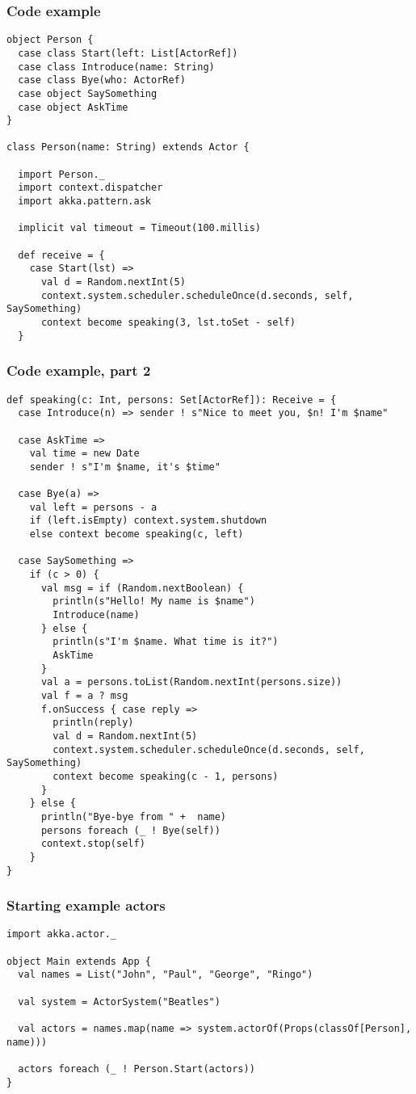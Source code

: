 \documentclass{beamer}
\begin{document}
\begin{frame}[fragile]
\frametitle{Code example}
\begin{lstlisting}[name=person]
object Person {
  case class Start(left: List[ActorRef])
  case class Introduce(name: String)
  case class Bye(who: ActorRef)
  case object SaySomething
  case object AskTime
}

class Person(name: String) extends Actor {

  import Person._
  import context.dispatcher
  import akka.pattern.ask

  implicit val timeout = Timeout(100.millis)

  def receive = {
    case Start(lst) =>
      val d = Random.nextInt(5)
      context.system.scheduler.scheduleOnce(d.seconds, self, SaySomething)
      context become speaking(3, lst.toSet - self)
  }
\end{lstlisting}
\end{frame}

\begin{frame}[fragile]
\frametitle{Code example, part 2}
\begin{lstlisting}[name=person]
def speaking(c: Int, persons: Set[ActorRef]): Receive = {
  case Introduce(n) => sender ! s"Nice to meet you, $n! I'm $name"

  case AskTime =>
    val time = new Date
    sender ! s"I'm $name, it's $time"

  case Bye(a) =>
    val left = persons - a
    if (left.isEmpty) context.system.shutdown
    else context become speaking(c, left)

  case SaySomething =>
    if (c > 0) {
      val msg = if (Random.nextBoolean) {
        println(s"Hello! My name is $name")
        Introduce(name)
      } else {
        println(s"I'm $name. What time is it?")
        AskTime
      }
      val a = persons.toList(Random.nextInt(persons.size))
      val f = a ? msg
      f.onSuccess { case reply =>
        println(reply)
        val d = Random.nextInt(5)
        context.system.scheduler.scheduleOnce(d.seconds, self, SaySomething)
        context become speaking(c - 1, persons)
      }
    } else {
      println("Bye-bye from " +  name)
      persons foreach (_ ! Bye(self))
      context.stop(self)
    }
}
\end{lstlisting}
\end{frame}

\begin{frame}[fragile]
\frametitle{Starting example actors}
\begin{lstlisting}
import akka.actor._

object Main extends App {
  val names = List("John", "Paul", "George", "Ringo")

  val system = ActorSystem("Beatles")

  val actors = names.map(name => system.actorOf(Props(classOf[Person], name)))

  actors foreach (_ ! Person.Start(actors))
}
\end{lstlisting}
\end{frame}
\end{document}
